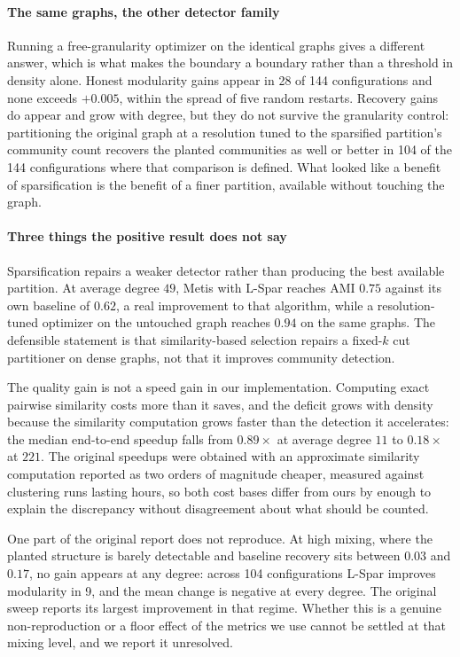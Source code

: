 \paragraph{The same graphs, the other detector family}
Running a free-granularity optimizer on the identical graphs gives a different
answer, which is what makes the boundary a boundary rather than a threshold in
density alone. Honest modularity gains appear in 28 of 144 configurations and
none exceeds $+0.005$, within the spread of five random restarts. Recovery gains
do appear and grow with degree, but they do not survive the granularity control:
partitioning the original graph at a resolution tuned to the sparsified
partition's community count recovers the planted communities as well or better in
104 of the 144 configurations where that comparison is defined. What looked like
a benefit of sparsification is the benefit of a finer partition, available
without touching the graph.

\paragraph{Three things the positive result does not say}
Sparsification repairs a weaker detector rather than producing the best available
partition. At average degree $49$, Metis with L-Spar reaches AMI $0.75$ against
its own baseline of $0.62$, a real improvement to that algorithm, while a
resolution-tuned optimizer on the untouched graph reaches $0.94$ on the same
graphs. The defensible statement is that similarity-based selection repairs a
fixed-$k$ cut partitioner on dense graphs, not that it improves community
detection.

The quality gain is not a speed gain in our implementation. Computing exact
pairwise similarity costs more than it saves, and the deficit grows with density
because the similarity computation grows faster than the detection it
accelerates: the median end-to-end speedup falls from $0.89\times$ at average
degree $11$ to $0.18\times$ at $221$. The original speedups were obtained with an
approximate similarity computation reported as two orders of magnitude cheaper,
measured against clustering runs lasting hours, so both cost bases differ from
ours by enough to explain the discrepancy without disagreement about what should
be counted.

One part of the original report does not reproduce. At high mixing, where the
planted structure is barely detectable and baseline recovery sits between $0.03$
and $0.17$, no gain appears at any degree: across 104 configurations L-Spar
improves modularity in 9, and the mean change is negative at every degree. The
original sweep reports its largest improvement in that regime. Whether this is a
genuine non-reproduction or a floor effect of the metrics we use cannot be
settled at that mixing level, and we report it unresolved.
